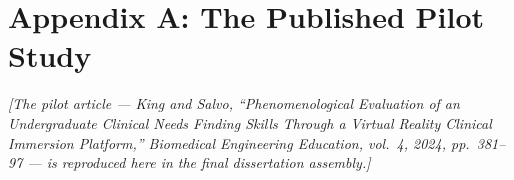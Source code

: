 \documentclass{article}
\begin{document}
\clearpage

\section*{Appendix A: The Published Pilot Study}\label{app:vr-pilot}
\textit{[The pilot article --- King and Salvo, ``Phenomenological Evaluation
of an Undergraduate Clinical Needs Finding Skills Through a Virtual Reality
Clinical Immersion Platform,'' Biomedical Engineering Education, vol.~4,
2024, pp.~381--97 --- is reproduced here in the final dissertation
assembly.]}

\clearpage


\clearpage


\clearpage

\end{document}
